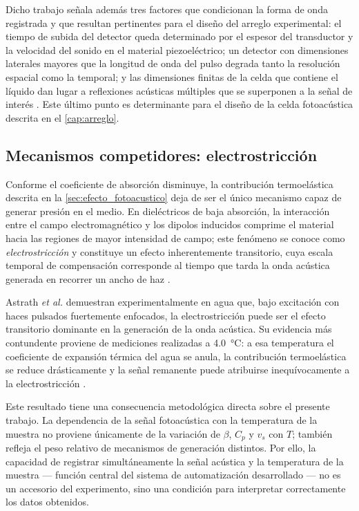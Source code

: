 Dicho trabajo señala además tres factores que condicionan la forma
de onda registrada y que resultan pertinentes para el diseño del
arreglo experimental: el tiempo de subida del detector queda
determinado por el espesor del transductor y la velocidad del
sonido en el material piezoeléctrico; un detector con dimensiones
laterales mayores que la longitud de onda del pulso degrada tanto
la resolución espacial como la temporal; y las dimensiones finitas
de la celda que contiene el líquido dan lugar a reflexiones
acústicas múltiples que se superponen a la señal de interés
\cite{Quan1994}. Este último punto es determinante para el diseño
de la celda fotoacústica descrita en el \cref{cap:arreglo}.

\subsection*{Mecanismos competidores: electrostricción}

Conforme el coeficiente de absorción disminuye, la contribución
termoelástica descrita en la \cref{sec:efecto_fotoacustico} deja de
ser el único mecanismo capaz de generar presión en el medio. En
dieléctricos de baja absorción, la interacción entre el campo
electromagnético y los dipolos inducidos comprime el material hacia
las regiones de mayor intensidad de campo; este fenómeno se conoce
como \textit{electrostricción} y constituye un efecto inherentemente
transitorio, cuya escala temporal de compensación corresponde al
tiempo que tarda la onda acústica generada en recorrer un ancho de
haz \cite{Astrath2023}.

Astrath \textit{et al.} demuestran experimentalmente en agua que,
bajo excitación con haces pulsados fuertemente enfocados, la
electrostricción puede ser el efecto transitorio dominante en la
generación de la onda acústica. Su evidencia más contundente
proviene de mediciones realizadas a \SI{4.0}{\celsius}: a esa
temperatura el coeficiente de expansión térmica del agua se anula,
la contribución termoelástica se reduce drásticamente y la señal
remanente puede atribuirse inequívocamente a la electrostricción
\cite{Astrath2023}.

Este resultado tiene una consecuencia metodológica directa sobre el
presente trabajo. La dependencia de la señal fotoacústica con la
temperatura de la muestra no proviene únicamente de la variación de
$\beta$, $C_p$ y $v_s$ con $T$; también refleja el peso relativo de
mecanismos de generación distintos. Por ello, la capacidad de
registrar simultáneamente la señal acústica y la temperatura de la
muestra --- función central del sistema de automatización
desarrollado --- no es un accesorio del experimento, sino una
condición para interpretar correctamente los datos obtenidos.

